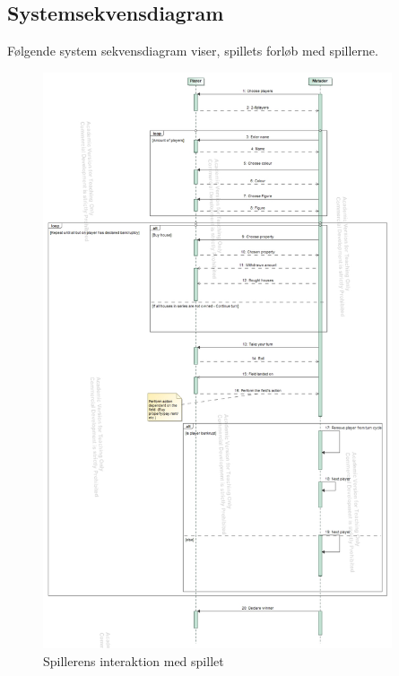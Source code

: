 \subsection{Systemsekvensdiagram}
Følgende system sekvensdiagram viser, spillets forløb med spillerne.
\begin{figure}[H]
    \centering
    \includegraphics[height=17cm]{sources/6_design/SystemSekvensDiagramMatador.jpg}
    \caption{Spillerens interaktion med spillet}
    \label{fig:KD1}
\end{figure}
